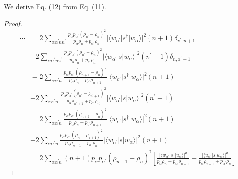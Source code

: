 \documentclass[../../note.tex]{subfiles}
\begin{document}
\begin{lemma}[Eq. (11) to Eq. (12)]
\label{lemma: 11 -> 12}
    We derive Eq. (12) from Eq. (11).
\end{lemma}
\begin{proof}
    \begin{align}
        \cdots
        &= 2 \sum_{\alpha \alpha^\prime n n^\prime} \frac{p_{\alpha} p_{\alpha^\prime} (\rho_{n^\prime} - \rho_n)^2}{p_{\alpha} \rho_{n} + p_{\alpha^\prime} \rho_{n^\prime}} \vert \langle w_{\alpha^\prime} \vert s^\dagger \vert w_{\alpha} \rangle \vert^2 (n+1) \delta_{n^\prime, n+1} \nonumber \\
        &+ 2 \sum_{\alpha \alpha^\prime n n^\prime} \frac{p_{\alpha} p_{\alpha^\prime} (\rho_{n^\prime} - \rho_n)^2}{p_{\alpha} \rho_{n} + p_{\alpha^\prime} \rho_{n^\prime}} \vert \langle w_{\alpha^\prime} \vert s \vert w_{\alpha} \rangle \vert^2 (n^\prime + 1) \delta_{n, n^\prime+1} \\
        &= 2 \sum_{\alpha \alpha^\prime n} \frac{p_{\alpha} p_{\alpha^\prime} (\rho_{n+1} - \rho_n)^2}{p_{\alpha} \rho_{n} + p_{\alpha^\prime} \rho_{n+1}} \vert \langle w_{\alpha^\prime} \vert s^\dagger \vert w_{\alpha} \rangle \vert^2 (n+1) \nonumber \\
        &+ 2 \sum_{\alpha \alpha^\prime n^\prime} \frac{p_{\alpha} p_{\alpha^\prime} (\rho_{n^\prime} - \rho_{n^\prime + 1})^2}{p_{\alpha} \rho_{n^\prime + 1} + p_{\alpha^\prime} \rho_{n^\prime}} \vert \langle w_{\alpha^\prime} \vert s \vert w_{\alpha} \rangle \vert^2 (n^\prime + 1) \\
        &= 2 \sum_{\alpha \alpha^\prime n} \frac{p_{\alpha} p_{\alpha^\prime} (\rho_{n+1} - \rho_n)^2}{p_{\alpha} \rho_{n} + p_{\alpha^\prime} \rho_{n+1}} \vert \langle w_{\alpha^\prime} \vert s^\dagger \vert w_{\alpha} \rangle \vert^2 (n+1) \nonumber \\
        &+ 2 \sum_{\alpha \alpha^\prime n} \frac{p_{\alpha} p_{\alpha^\prime} (\rho_{n} - \rho_{n + 1})^2}{p_{\alpha} \rho_{n + 1} + p_{\alpha^\prime} \rho_{n}} \vert \langle w_{\alpha^\prime} \vert s \vert w_{\alpha} \rangle \vert^2 (n + 1) \\
        &= 2 \sum_{\alpha \alpha^\prime n} (n+1) p_{\alpha} p_{\alpha^\prime} (\rho_{n+1} - \rho_n)^2 \left[\frac{\vert \langle w_{\alpha^\prime} \vert s^\dagger \vert w_{\alpha} \rangle \vert^2}{p_{\alpha} \rho_n + p_{\alpha^\prime} \rho_{n+1}} + \frac{\vert \langle w_{\alpha^\prime} \vert s \vert w_{\alpha} \rangle \vert^2}{p_{\alpha } \rho_{n+1} + p_{\alpha^\prime} \rho_n} \right]
    \end{align}
\end{proof}
\end{document}
